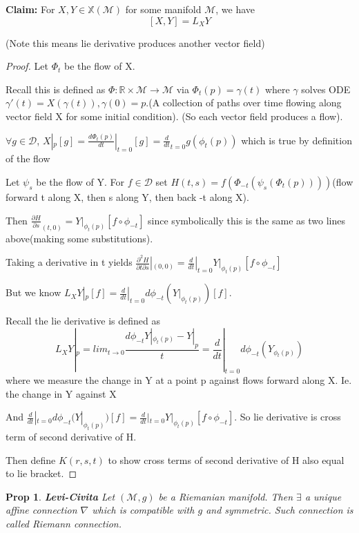 \documentclass[11pt]{article}
\newcommand{\R}{\mathbb{R}}
\newcommand{\m}{\mathcal{M}}
\newcommand{\dD}{\mathcal{D}}
\newtheorem{prop}{Prop}
\begin{document}
\textbf{Claim:} For $X,Y \in \mathbb{X}(\m)$ for some manifold $\m$, we have
\[
	[X,Y] = L_XY
\]

(Note this means lie derivative produces another vector field)

\begin{proof}

	Let $\Phi_t$ be the flow of X. 

	Recall this is defined as $\Phi: \R \times \m \to \m$ via $\Phi_t(p) = \gamma(t)$ where $\gamma$ solves ODE $\gamma'(t) = X(\gamma(t)), \gamma(0) = p$.(A collection of paths over time flowing along vector field X for some initial condition). (So each vector field produces a flow).

	$\forall g \in \dD$, $X|_p[g] = \frac{d\Phi_t(p)}{dt}|_{t=0}[g] = \frac{d}{dt}_{t=0}g(\phi_t(p))$ which is true by definition of the flow

	Let $\psi_s$ be the flow of Y. For $f \in \dD$ set $H(t,s) = f(\Phi_{-t}(\psi_s(\Phi_t(p))))$(flow forward t along X, then s along Y, then back -t along X). 

	Then $\frac{\partial H}{\partial s}_{(t,0)} = Y|_{\phi_t(p)} [f \circ \phi_{-t}]$ since symbolically this is the same as two lines above(making some substitutions).

	Taking a derivative in t yields $\frac{\partial^2 H}{\partial t \partial s}|_{(0,0)} = \frac{d}{dt}|_{t=0} Y|_{\phi_t(p)}[f \circ \phi_{-t}]$

	But we know $L_XY|_p[f] = \frac{d}{dt}|_{t=0} d\phi_{-t}(Y|_{\phi_t(p)})[f]$.

	Recall the lie derivative is defined as 
	\[
		L_X Y|_p = lim_{t\to 0} \frac{d\phi_{-t} Y|_{\phi_t(p)}-Y|_p}{t} = \frac{d}{dt}|_{t=0}d\phi_{-t}(Y_{\phi_t(p)})
	\]
	where we measure the change in Y at a point p against flows forward along X. Ie. the change in Y against X

	And $\frac{d}{dt}|_{t=0} d\phi_{-t}(Y|_{\phi_t(p)})[f] = \frac{d}{dt}|_{t=0} Y|_{\phi_t(p)}[f \circ \phi_{-t}]$. So lie derivative is cross term of second derivative of H.

	Then define $K(r,s,t)$ to show cross terms of second derivative of H also equal to lie bracket. 

\end{proof}


\begin{prop}\textbf{Levi-Civita}
	Let $(\m,g)$ be a Riemanian manifold. Then $\exists$ a unique affine connection $\nabla$ which is compatible with $g$ and symmetric. Such connection is called Riemann connection.
\end{prop}
\end{document}
